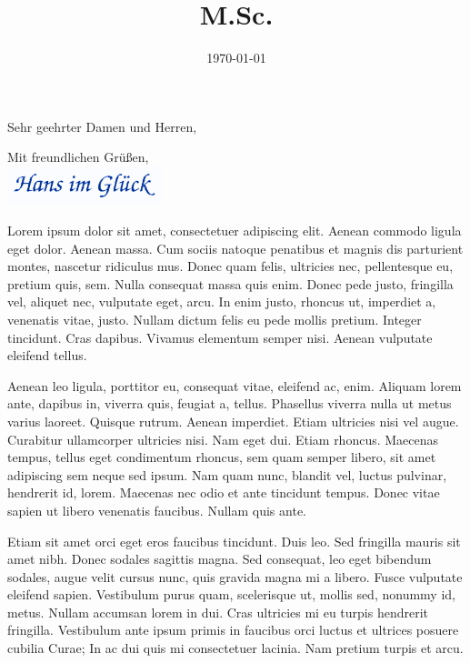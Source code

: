 \documentclass[11pt,a4paper,sans]{moderncv}        %
\title{M.Sc.}                               %
\begin{document}


\date{\today}
\opening{Sehr geehrter Damen und Herren,}
\closing{Mit freundlichen Grüßen, \vspace{0,3cm} \\ \includegraphics[width=4.5cm]{unterschrift.png} \vspace{-1,0cm}}
\makelettertitle

Lorem ipsum dolor sit amet, consectetuer adipiscing elit. Aenean commodo ligula eget dolor. Aenean massa. Cum sociis natoque penatibus et magnis dis parturient montes, nascetur ridiculus mus. Donec quam felis, ultricies nec, pellentesque eu, pretium quis, sem. Nulla consequat massa quis enim. Donec pede justo, fringilla vel, aliquet nec, vulputate eget, arcu. In enim justo, rhoncus ut, imperdiet a, venenatis vitae, justo. Nullam dictum felis eu pede mollis pretium. Integer tincidunt. Cras dapibus. Vivamus elementum semper nisi. Aenean vulputate eleifend tellus.

Aenean leo ligula, porttitor eu, consequat vitae, eleifend ac, enim. Aliquam lorem ante, dapibus in, viverra quis, feugiat a, tellus. Phasellus viverra nulla ut metus varius laoreet. Quisque rutrum. Aenean imperdiet. Etiam ultricies nisi vel augue. Curabitur ullamcorper ultricies nisi. Nam eget dui. Etiam rhoncus. Maecenas tempus, tellus eget condimentum rhoncus, sem quam semper libero, sit amet adipiscing sem neque sed ipsum. Nam quam nunc, blandit vel, luctus pulvinar, hendrerit id, lorem. Maecenas nec odio et ante tincidunt tempus. Donec vitae sapien ut libero venenatis faucibus. Nullam quis ante.

Etiam sit amet orci eget eros faucibus tincidunt. Duis leo. Sed fringilla mauris sit amet nibh. Donec sodales sagittis magna. Sed consequat, leo eget bibendum sodales, augue velit cursus nunc, quis gravida magna mi a libero. Fusce vulputate eleifend sapien. Vestibulum purus quam, scelerisque ut, mollis sed, nonummy id, metus. Nullam accumsan lorem in dui. Cras ultricies mi eu turpis hendrerit fringilla. Vestibulum ante ipsum primis in faucibus orci luctus et ultrices posuere cubilia Curae; In ac dui quis mi consectetuer lacinia. Nam pretium turpis et arcu.
\end{document}
